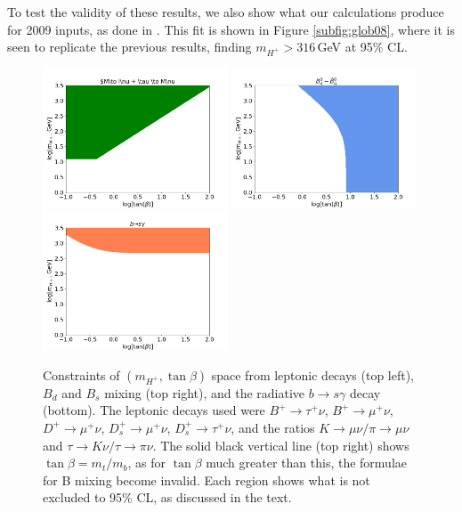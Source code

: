 \documentclass[a4paper,12pt]{article}
\begin{document}
To test the validity of these results, we also show what our calculations produce for 2009 inputs, as done in \cite{desc}.
This fit is shown in Figure \ref{subfig:glob08}, where it is seen to replicate the previous results, finding $m_{H^+} > 316\,$GeV at 95\% CL.
\begin{figure}[ht]
    \vspace{-12pt}
    \centering
    \includegraphics[width=0.49\textwidth]{indy/leps.png}
    \includegraphics[width=0.49\textwidth]{indy/bmix.png}
    \includegraphics[width=0.49\textwidth]{indy/bsgamma.png}
    \caption{\label{fig:indies}Constraints of $(m_{H^+},\tan\beta)$ space from leptonic decays (top left), $B_d$ and $B_s$ mixing (top right), and the radiative $b\to s\gamma$ decay (bottom). The leptonic decays used were $B^+\to\tau^+\nu$, $B^+\to\mu^+\nu$, $D^+\to\mu^+\nu$, $D_s^+\to\mu^+\nu$, $D_s^+\to\tau^+\nu$, and the ratios $K\to\mu\nu/\pi\to\mu\nu$ and $\tau\to K\nu/\tau\to\pi\nu$. 
        The solid black vertical line (top right) shows $\tan\beta=m_t/m_b$, as for $\tan\beta$ much greater than this, the formulae for B mixing become invalid. 
    Each region shows what is not excluded to 95\% CL, as discussed in the text.}
\end{figure}
\end{document}
